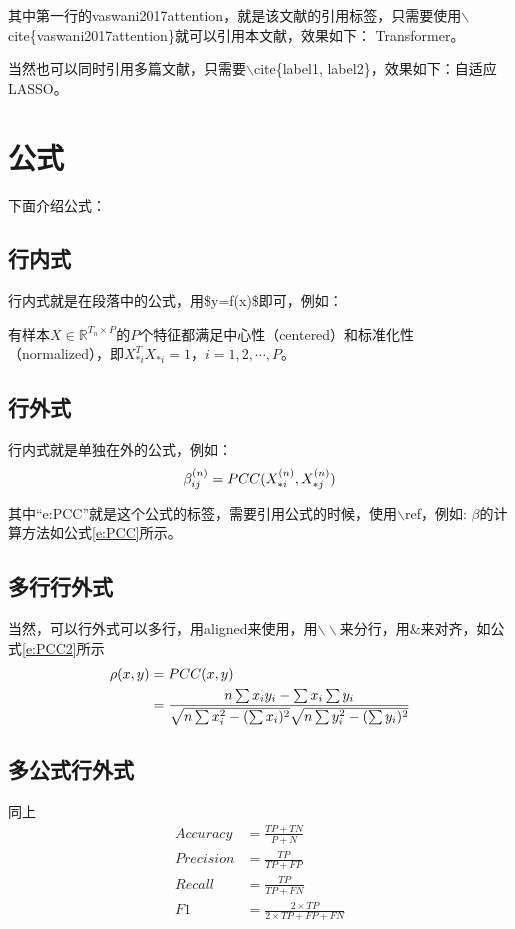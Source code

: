 其中第一行的vaswani2017attention，就是该文献的引用标签，只需要使用$\backslash$cite\{vaswani2017attention\}就可以引用本文献，效果如下：
Transformer\cite{vaswani2017attention}。

当然也可以同时引用多篇文献，只需要$\backslash$cite\{label1, label2\}，效果如下：自适应LASSO\cite{leng2006note,meinshausen2006high}。


\section{公式}
下面介绍公式：
\subsection{行内式}
行内式就是在段落中的公式，用\$y=f(x)\$即可，例如：

有样本$X\in \mathbb{R}^{T_n\times P}$的$P$个特征都满足中心性（centered）和标准化性（normalized），即$X^T_{*i}X_{*i}=1$，$i=1,2,\cdots,P$。

\subsection{行外式}
行内式就是单独在外的公式，例如：
\begin{equation}
  \centering
  \label{e:PCC}
  \beta^{(n)}_{ij}=PCC(X^{(n)}_{*i},X^{(n)}_{*j}) 
\end{equation}

其中“e:PCC”就是这个公式的标签，需要引用公式的时候，使用$\backslash$ref，例如:
$\beta$的计算方法如公式\ref{e:PCC}所示。


\subsection{多行行外式}
当然，可以行外式可以多行，用aligned来使用，用$\backslash\backslash$来分行，用\&来对齐，如公式\ref{e:PCC2}所示
\begin{equation}
  \centering
  \label{e:PCC2}
  \begin{aligned}
  \rho(x,y)&=PCC(x,y)\\
  &=\frac{n\sum{x_iy_i-\sum{x_i}\sum{y_i}}}{\sqrt{n\sum{x^2_i}-(\sum{x_i})^2}\sqrt{n\sum{y^2_i}-(\sum{y_i})^2}}
  \end{aligned}
\end{equation}

\subsection{多公式行外式}
同上
\begin{equation}
\label{e:mfunction}
\begin{aligned}
  Accuracy & = \frac{TP+TN}{P+N}
  \\
  Precision & = \frac{TP}{TP+FP}
  \\
  Recall &= \frac{TP}{TP+FN}
  \\
  F1 &= \frac{2\times TP}{2\times TP + FP + FN}
\end{aligned}
\end{equation}

